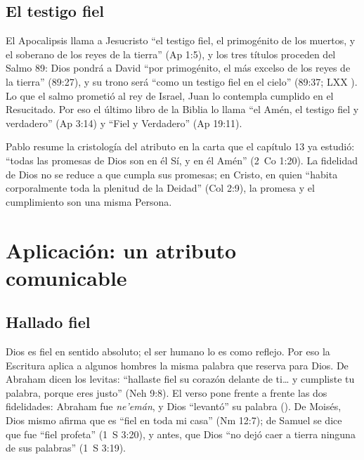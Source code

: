 
\subsection{El testigo fiel}
El Apocalipsis llama a Jesucristo ``el testigo fiel, el primogénito de los muertos, y el soberano de los reyes de la tierra'' (Ap 1:5), y los tres títulos proceden del Salmo 89: Dios pondrá a David ``por primogénito, el más excelso de los reyes de la tierra'' (89:27), y su trono será ``como un testigo fiel en el cielo'' (89:37; LXX ). Lo que el salmo prometió al rey de Israel, Juan lo contempla cumplido en el Resucitado. Por eso el último libro de la Biblia lo llama ``el Amén, el testigo fiel y verdadero'' (Ap 3:14) y ``Fiel y Verdadero'' (Ap 19:11).


Pablo resume la cristología del atributo en la carta que el capítulo 13 ya estudió: ``todas las promesas de Dios son en él Sí, y en él Amén'' (2~Co 1:20). La fidelidad de Dios no se reduce a que cumpla sus promesas; en Cristo, en quien ``habita corporalmente toda la plenitud de la Deidad'' (Col 2:9), la promesa y el cumplimiento son una misma Persona.

\section{Aplicación: un atributo comunicable}

\subsection{Hallado fiel}
Dios es fiel en sentido absoluto; el ser humano lo es como reflejo. Por eso la Escritura aplica a algunos hombres la misma palabra que reserva para Dios. De Abraham dicen los levitas: ``hallaste fiel su corazón delante de ti\ldots{} y cumpliste tu palabra, porque eres justo'' (Neh 9:8). El verso pone frente a frente las dos fidelidades: Abraham fue \emph{ne'emán}, y Dios ``levantó'' su palabra (). De Moisés, Dios mismo afirma que es ``fiel en toda mi casa'' (Nm 12:7); de Samuel se dice que fue ``fiel profeta'' (1~S 3:20), y antes, que Dios ``no dejó caer a tierra ninguna de sus palabras'' (1~S 3:19).

